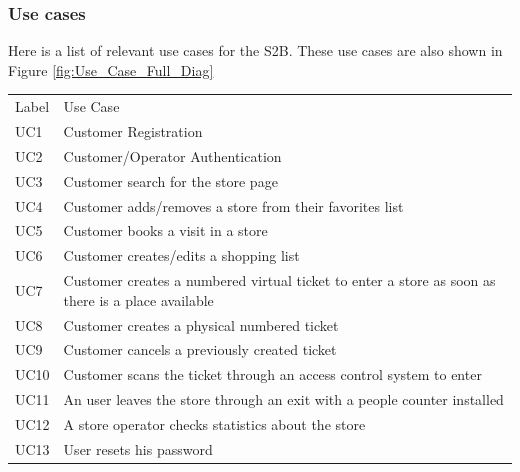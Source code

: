 \subsubsection{Use cases}
Here is a list of relevant use cases for the S2B. These use cases are also shown in Figure \ref{fig:Use_Case_Full_Diag}
\smallskip

\renewcommand{\arraystretch}{1.2}
\begin{tabular}{C{2cm}L{13.1cm}}
    Label & Use Case                                                                                          \\
    UC1   & Customer Registration                                                                             \\
    UC2   & Customer/Operator Authentication                                                                  \\
    UC3   & Customer search for the store page                                                                \\
    UC4   & Customer adds/removes a store from their favorites list                                           \\
    UC5   & Customer books a visit in a store                                                                 \\
    UC6   & Customer creates/edits a shopping list                                                            \\
    UC7   & Customer creates a numbered virtual ticket to enter a store as soon as there is a place available \\
    UC8   & Customer creates a physical numbered ticket                                                       \\
    UC9   & Customer cancels a previously created ticket                                                      \\
    UC10  & Customer scans the ticket through an access control system to enter                               \\
    UC11  & An user leaves the store through an exit with a people counter installed                          \\
    UC12  & A store operator checks statistics about the store                                                \\
    UC13  & User resets his password                                                                          \\
\end{tabular}
